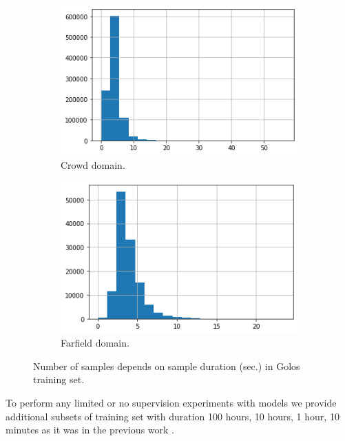 \documentclass[a4paper]{article}
\begin{document}
\begin{figure}[ht]
\begin{subfigure}{.49\linewidth}
  \centering
  \includegraphics[width=1.\linewidth]{LaTeX/img/toloka_lens.png}  
  \caption{Crowd domain.}
  \label{fig:sub-first}
\end{subfigure}
\begin{subfigure}{.49\linewidth}
  \centering
  \includegraphics[width=1.\linewidth]{LaTeX/img/portal_lens.png}  
  \caption{Farfield domain.}
  \label{fig:sub-second}
\end{subfigure}
\caption{Number of samples depends on sample duration (sec.) in Golos training set.}
\label{fig:duration_distribution}
\end{figure}

To perform any limited  or  no  supervision experiments with models we provide additional subsets of training set with duration 100 hours, 10 hours, 1 hour, 10 minutes as it was in the previous work \cite{kahn2020libri}.
\end{document}
